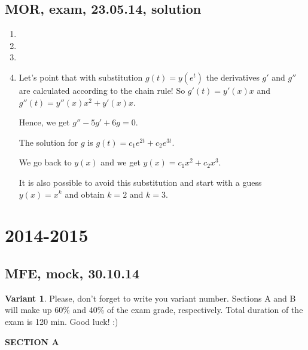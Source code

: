 \documentclass[12pt]{article} %
\theoremstyle{definition} %
\begin{document}
\subsection{MOR, exam, 23.05.14, solution}

\begin{enumerate}
\item 
\item 
\item 
\item Let's point that with substitution $g(t) = y(e^t)$ the derivatives $g'$ and $g''$ are calculated according to the chain rule!
So $g'(t) = y'(x)x$ and $g''(t) = y''(x)x^2 + y'(x) x$.

Hence, we get $g'' - 5g' + 6g=0$.

The solution for $g$ is $g(t) = c_1 e^{2t} + c_2 e^{3t}$.

We go back to $y(x)$ and we get $y(x) = c_1 x^2 + c_2 x^3$.

It is also possible to avoid this substitution and start with a guess $y(x) = x^k$ and obtain $k=2$ and $k=3$.


\end{enumerate}



\section{2014-2015}

\subsection{MFE, mock, 30.10.14}

\textbf{Variant 1}. Please, don't forget to write you variant number. Sections A and B will make up 60\% and 40\% of the exam grade, respectively. Total duration of the exam is 120 min. Good luck! :)

\textbf{SECTION A}
\end{document}
